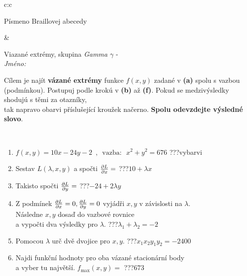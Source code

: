 \documentclass[10pt]{report}
\begin{document}
\begin{tabular}{c:c}
\begin{minipage}[c][104.5mm][t]{0.5\linewidth}
\begin{center}
\begin{minipage}{0.20\linewidth}
\begin{center}
{\small Písmeno Braillovej abecedy}
\end{center}
\end{minipage}
\end{center}
\end{minipage}
&
\begin{minipage}[c][104.5mm][t]{0.5\linewidth}
\begin{center}
\vspace{7mm}
{\huge Viazané extrémy, skupina \textit{Gamma $\gamma$} -}\\[5mm]
\textit{Jméno:}\phantom{xxxxxxxxxxxxxxxxxxxxxxxxxxxxxxxxxxxxxxxxxxxxxxxxxxxxxxxxxxxxxxxxx}\\[5mm]
\begin{minipage}{0.95\linewidth}
\begin{center}
Cílem je najít \textbf{vázané extrémy} funkce $f(x,y)$ zadané v \textbf{(a)} spolu s vazbou (podmínkou). Postupuj podle krokú v \textbf{(b)} až \textbf{(f)}. Pokud se medzivýsledky shodujú s těmi za otazníky,\\tak napravo obarvi příslušející kroužek načerno. \textbf{Spolu odevzdejte výsledné slovo}.
\end{center}
\end{minipage}
\\[1mm]
\begin{minipage}{0.79\linewidth}
\begin{center}
\begin{varwidth}{\linewidth}
\begin{enumerate}
\normalsize
\item $f(x,y)=10x-24y-2 \enspace , \enspace \mathrm{vazba:} \enspace x^2+y^2=676$\quad \dotfill\; ???\;\dotfill \quad vybarvi
\item Sestav $L(\lambda,x,y)$ a spočti $\pdv{L}{x}=$\quad \dotfill\; ???\;\dotfill \quad $10+\lambda x$
\item Takisto spočti $\pdv{L}{y}=$\quad \dotfill\; ???\;\dotfill \quad $-24+2\lambda y$
\item Z podmínek $\pdv{L}{x}=0 , \pdv{L}{y}=0$ vyjádři $x,y$ v závislosti na $\lambda$.\\ \phantom{xxxxxx}Následne $x,y$ dosaď do vazbové rovnice\\ \phantom{xxxxxx}a vypočti dva výsledky pro $\lambda$.\quad \dotfill\; ???\;\dotfill \quad $\lambda_1+\lambda_2=-2$
\item Pomocou $\lambda$ urč dvě dvojice pro $x,y$.\quad \dotfill\; ???\;\dotfill \quad $x_1 x_2 y_1 y_2=-2400$
\item Najdi funkční hodnoty pro oba vázané stacionární body\\ \phantom{xxxxxx}a vyber tu najvětší. $f_{\text{max}}(x,y)=$\quad \dotfill\; ???\;\dotfill \quad $673$

\end{enumerate}
\end{varwidth}
\end{center}
\end{minipage}
\end{center}
\end{minipage}
\end{tabular}
\end{document}

